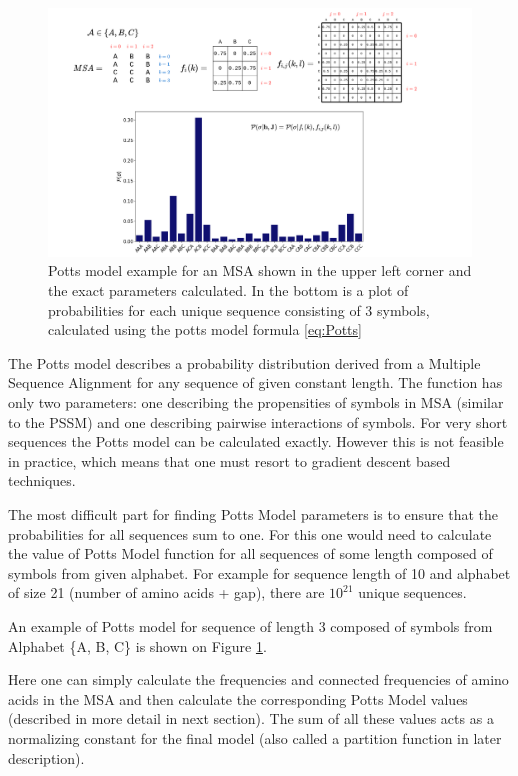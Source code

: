 \begin{figure}
    \centering
    \includegraphics[width=\linewidth]{imgs_tomas/potts_example.png}
    \caption{Potts model example for an MSA shown in the upper left corner and the exact parameters calculated. In the bottom is a plot of probabilities for each unique sequence consisting of 3 symbols, calculated using the potts model formula \ref{eq:Potts}}
    \label{fig:potts_example}
\end{figure}

The Potts model describes a probability distribution derived from a Multiple Sequence Alignment for any sequence of given constant length. The function has only two parameters: one describing the propensities of symbols in MSA (similar to the PSSM) and one describing pairwise interactions of symbols. For very short sequences the Potts model can be calculated exactly. However this is not feasible in practice, which means that one must resort to gradient descent based techniques. 

The most difficult part for finding Potts Model parameters is to ensure that the probabilities for all sequences sum to one. For this one would need to calculate the value of Potts Model function for all sequences of some length composed of symbols from given alphabet. For example for sequence length of 10 and alphabet of size 21 (number of amino acids + gap), there are $10^{21}$ unique sequences.

An example of Potts model for sequence of length 3 composed of symbols from Alphabet \{A, B, C\} is shown on Figure \ref{fig:potts_example}.

Here one can simply calculate the frequencies and connected frequencies of amino acids in the MSA and then calculate the corresponding Potts Model values (described in more detail in next section). The sum of all these values acts as a normalizing constant for the final model (also called a partition function in later description). 

